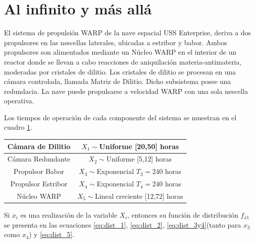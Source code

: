 \documentclass{sig-alternate}
\begin{document}
\section{Al infinito y m\'as all\'a}
\label{sec:buzzlightyear}

El sistema de propulsi\'on WARP de la nave espacial USS Enterprise,
deriva a dos propulsores en las nescellas laterales, ubicadas a
estribor y babor. Ambos propulsores son alimentados mediante un
N\'ucleo WARP en el interior de un reactor donde se llevan a
cabo reacciones de aniquilaci\'on materia-antimateria, moderadas
por cristales de dilitio. Los cristales de dilitio se procesan en
una c\'amara controlada, llamada Matriz de Dilitio.
Dicho subsistema posee una redundacia. La nave puede propulsarse
a velocidad WARP con una sola nescella operativa.

Los tiempos de operaci\'on de cada componente del sistema se muestran
en el cuadro \ref{tab:components}.

\begin{table}
\label{tab:components}
\centering
\begin{tabular}{|c|c|}
\hline
  C\'amara de Dilitio & $X_{1}\sim$Uniforme [20,50] horas \\
\hline
  C\'amara Redundante & $X_{2}\sim$Uniforme [5,12] horas \\
\hline
  Propulsor Babor & $X_{3}\sim$Exponencial $T_{3}=240$ horas \\
\hline
  Propulsor Estribor & $X_{4}\sim$Exponencial $T_{4}=240$ horas \\
\hline
  N\'ucleo WARP & $X_{5}\sim$Lineal creciente [12,72] horas \\
\hline
\end{tabular}
\end{table}

Si $x_i$ es una realizaci\'on de la variable $X_i$, entonces su funci\'on de distribuci\'on $f_{x1}$
se presenta en las ecuaciones \eqref{eq:dist_1}, \eqref{eq:dist_2},
\eqref{eq:dist_3y4}(tanto para $x_3$ como $x_4$) y \eqref{eq:dist_5}.
\end{document}
